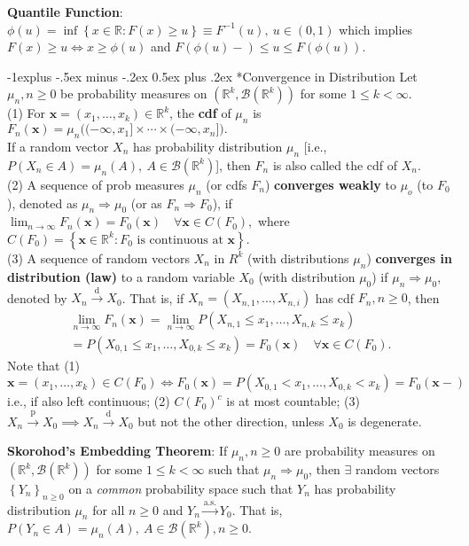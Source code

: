 \documentclass[paper=letter,fontsize=2.89mm]{scrartcl}
\makeatletter
\newcommand{\convdist}{\stackrel{\text{d}}{\longrightarrow}}
\newcommand{\convprob}{\stackrel{\text{p}}{\longrightarrow}}
\newcommand{\convas}{\stackrel{\text{a.s.}}{\longrightarrow}}
\newcommand{\Borel}{\mathcal{B}}
\newcommand{\R}{\mathbb{R}}
\newcommand\set[1]{\left\{ #1 \right\}}
\renewcommand{\subsection}{\@startsection{subsection}{2}{0mm}%
                                {-1explus -.5ex minus -.2ex}%
                                {0.5ex plus .2ex}%
                                {\normalfont\normalsize\bfseries}}
\makeatother
\begin{document}
\begin{multicols*}{3}
\textbf{Quantile Function}: $\phi(u) = \inf\set{x \in \R: F(x) \ge u} \equiv F^{-1}(u), ~u \in (0,1)$ which implies
$F(x) \ge u \iff x \ge \phi(u)$ and  $F(\phi(u)-) \le u \le F(\phi(u)).$ \\ \medskip

\subsection*{Convergence in Distribution}
Let $\mu_n, n\ge0$ be probability measures on $(\R^k, \Borel(\R^k))$ for some $1 \le k < \infty$. \\
(1) For $\mathbf{x} = (x_1, \dots, x_k) \in \R^k$, the \textbf{cdf} of $\mu_n$ is
$F_n(\mathbf{x}) = \mu_n\big( (-\infty, x_1] \times \cdots \times (-\infty, x_n]\big).$ \\
If a random vector $X_n$ has probability distribution $\mu_n$ [i.e., $P(X_n \in A) = \mu_n(A), ~A \in \Borel(\R^k)$], then $F_n$ is also called the cdf of $X_n$.  \\
(2) A sequence of prob measures $\mu_n$ (or cdfs $F_n$) \textbf{converges weakly} to $\mu_o$ (to $F_0$), denoted as $\mu_n \Rightarrow \mu_0$ (or as $F_n \Rightarrow F_0$), if
$\lim_{n\to\infty}F_n(\mathbf{x}) = F_0(\mathbf{x}) \quad \forall \mathbf{x} \in C(F_0),$
where $C(F_0) = \set{\mathbf{x} \in \R^k: F_0 \text{ is continuous at } \mathbf{x}}$.  \\
(3) A sequence of random vectors $X_n$ in $R^k$ (with distributions $\mu_n$) \textbf{converges in distribution (law)} to a random variable $X_0$ (with distribution $\mu_0$) if $\mu_n \Rightarrow \mu_0$, denoted by $X_n \convdist X_0$. 
That is, if $X_n = (X_{n,1}, \dots, X_{n,i})$ has cdf $F_n, n \ge 0$, then
\begin{align*}
\lim_{n\to\infty}F_n(\mathbf{x}) 
= \lim_{n\to\infty} P(X_{n,1} \le x_1, \dots, X_{n,k} \le x_k) \\
= P(X_{0,1} \le x_1, \dots, X_{0,k} \le x_k) 
= F_0(\mathbf{x}) \quad \forall \mathbf{x} \in C(F_0).
\end{align*}
Note that
(1) $\mathbf{x} = (x_1, \dots, x_k) \in C(F_0) \iff F_0(\mathbf{x}) = P(X_{0,1} < x_1, \dots, X_{0,k} < x_k) = F_0(\mathbf{x}-)$
i.e., if also left continuous; (2)  $C(F_0)^c$ is at most countable; (3)  $X_n \convprob X_0 \implies X_n \convdist X_0$ but not the other direction, unless $X_0$ is degenerate. \\ \medskip


\textbf{Skorohod's Embedding Theorem}: If $\mu_n, n\ge0$ are probability measures on $(\R^k, \Borel(\R^k))$ for some $1\le k < \infty$ such that $\mu_n \Rightarrow \mu_0$, then $\exists$ random vectors $\set{Y_n}_{n\ge0}$ on a \emph{common} probability space such that $Y_n$ has probability distribution $\mu_n$ for all $n \ge 0$ and $Y_n \convas Y_0$. That is, $P(Y_n \in A) = \mu_n(A), ~A \in \Borel(\R^k), n \ge 0$. \\ \medskip


\end{multicols*}
\end{document}
